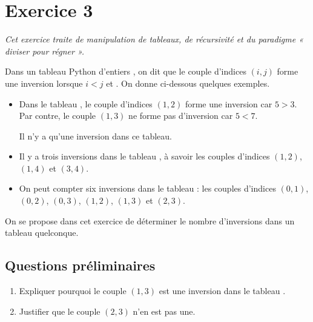 \documentclass[11pt,a4paper,french,twoside]{PMCours}
\begin{document}
\newpage
\section*{Exercice 3}
\emph{Cet exercice traite de manipulation de tableaux, de récursivité et du paradigme
« diviser pour régner ».}

\medskip
Dans un tableau Python d'entiers , on dit que le couple d'indices $(i,j)$ forme une inversion
lorsque $i<j$ et . On donne ci-dessous quelques exemples.
\begin{itemize}
\item Dans le tableau \code{[1, 5, 3, 7]}, le couple d'indices $(1,2)$ forme une inversion car $5 > 3$.
Par contre, le couple $(1,3)$ ne forme pas d'inversion car $5 < 7$.

Il n'y a qu'une inversion dans ce tableau.
\item Il y a trois inversions dans le tableau \code{[1, 6, 2, 7, 3]}, à savoir les couples d'indices
$(1, 2)$, $(1, 4)$ et $(3, 4)$.
\item On peut compter six inversions dans le tableau \code{[7, 6, 5, 3]} : les couples d'indices
$(0, 1)$, $(0, 2)$, $(0, 3)$, $(1, 2)$, $(1, 3)$ et $(2, 3)$.
\end{itemize}
On se propose dans cet exercice de déterminer le nombre d'inversions dans un tableau
quelconque.

\subsection*{Questions préliminaires}
\begin{enumerate}
    \item Expliquer pourquoi le couple $(1, 3)$ est une inversion dans le tableau \code{[4, 8, 3, 7]}.
    \item Justifier que le couple $(2, 3)$ n'en est pas une.
\end{enumerate}
\end{document}
